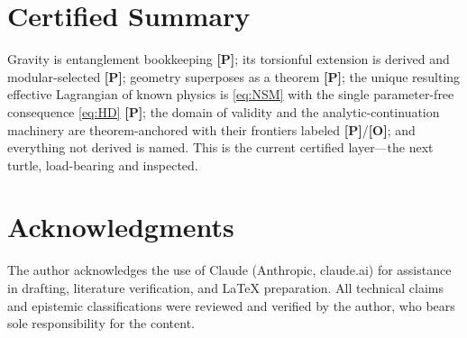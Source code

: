 \documentclass[11pt]{article}
\theoremstyle{definition}
\newcommand{\pP}{\textbf{[P]}}
\newcommand{\pO}{\textbf{[O]}}
\begin{document}
\section*{Certified Summary}
Gravity is entanglement bookkeeping \pP{}; its torsionful extension is
derived and modular-selected \pP{}; geometry superposes as a theorem
\pP{}; the unique resulting effective Lagrangian of known physics is
\eqref{eq:NSM} with the single parameter-free consequence \eqref{eq:HD}
\pP{}; the domain of validity and the analytic-continuation machinery are
theorem-anchored with their frontiers labeled \pP{}/\pO{}; and everything
not derived is named. This is the current certified layer---the next
turtle, load-bearing and inspected.

\section*{Acknowledgments}
The author acknowledges the use of Claude (Anthropic, claude.ai) for
assistance in drafting, literature verification, and \LaTeX{} preparation.
All technical claims and epistemic classifications were reviewed and
verified by the author, who bears sole responsibility for the content.
\end{document}
